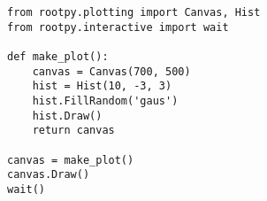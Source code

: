 \begin{footnotesize}
\begin{verbatim}
from rootpy.plotting import Canvas, Hist
from rootpy.interactive import wait

def make_plot():
    canvas = Canvas(700, 500)
    hist = Hist(10, -3, 3)
    hist.FillRandom('gaus')
    hist.Draw()
    return canvas

canvas = make_plot()
canvas.Draw()
wait()
\end{verbatim}
\end{footnotesize}
